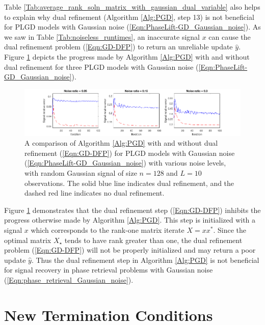 Table \ref{Tab:average_rank_soln_matrix_with_gaussian_dual_variable} also helps to explain why dual refinement (Algorithm \ref{Alg:PGD}, step 13) is not beneficial for PLGD models with Gaussian noise (\ref{Eqn:PhaseLift-GD_Gaussian_noise}).  As we saw in Table \ref{Tab:noiseless_runtimes}, an inaccurate signal $x$ can cause the dual refinement problem (\ref{Eqn:GD-DFP}) to return an unreliable update $\hat{y}$.  Figure \ref{Fig:noisy_random_DFP_vs_no_DFP} depicts the progress made by Algorithm \ref{Alg:PGD} with and without dual refinement for three PLGD models with Gaussian noise (\ref{Eqn:PhaseLift-GD_Gaussian_noise}).

\begin{figure}[H]
\hspace{-1.6cm}  \includegraphics[scale=0.6]{noisy_random_signal_DFP_vs_no_DFP}
\caption{A comparison of Algorithm \ref{Alg:PGD} with and without dual refinement (\ref{Eqn:GD-DFP}) for PLGD models with Gaussian noise (\ref{Eqn:PhaseLift-GD_Gaussian_noise}) with various noise levels, with random Gaussian signal of size $n = 128$ and $L = 10$ observations.  The solid blue line indicates dual refinement, and the dashed red line indicates no dual refinement.}
\label{Fig:noisy_random_DFP_vs_no_DFP}
\end{figure}



Figure \ref{Fig:noisy_random_DFP_vs_no_DFP} demonstrates that the dual refinement step (\ref{Eqn:GD-DFP})  inhibits the progress otherwise made by Algorithm \ref{Alg:PGD}.  This step is initialized with a signal $x$ which corresponds to the rank-one matrix iterate $X = xx^*$.  Since the optimal matrix $X_\star$ tends to have rank greater than one, the dual refinement problem (\ref{Eqn:GD-DFP}) will not be properly initialized and may return a poor update $\hat{y}$.  Thus the dual refinement step in Algorithm \ref{Alg:PGD} is not beneficial for signal recovery in phase retrieval problems with Gaussian noise (\ref{Eqn:phase_retrieval_Gaussian_noise}).





\section{New Termination Conditions}  	\label{Subsec:PLGD_term_crit-new_term_crit}


